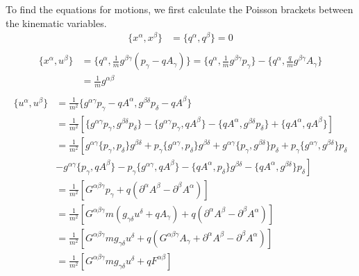 To find the equations for motions, we first calculate the Poisson brackets between the kinematic variables.
\begin{equation}
	\begin{aligned}
		\{x^\alpha, x^\beta\} &= \{q^\alpha, q^\beta\} = 0 \\
	\end{aligned}
\end{equation}
\begin{equation}
\begin{aligned}
		\{x^\alpha, u^\beta\} &= \{q^\alpha, \frac{1}{m} g^{\beta\gamma}(p_\gamma - q A_\gamma)\} = \{q^\alpha, \frac{1}{m} g^{\beta\gamma} p_\gamma\} - \{q^\alpha, \frac{q}{m} g^{\beta\gamma} A_\gamma\} \\
		&= \frac{1}{m} g^{\alpha\beta} \\
\end{aligned}
\end{equation}
\begin{equation}
\begin{aligned}
		\{u^\alpha, u^\beta\} &= \frac{1}{m^2} \{g^{\alpha \gamma} 	p_\gamma - q A^\alpha, g^{\beta \delta} p_\delta - q A^\beta\} \\
		&= \frac{1}{m^2}\left[ \{g^{\alpha \gamma} p_\gamma, g^{\beta \delta} p_\delta\} - \{g^{\alpha \gamma} p_\gamma, q A^\beta\} - \{q A^\alpha , g^{\beta \delta} p_\delta \} + \{q A^\alpha , q A^\beta\} \right]\\
		&= \frac{1}{m^2}\left[ g^{\alpha \gamma} \{p_\gamma, p_\delta\} g^{\beta \delta} + p_\gamma \{g^{\alpha \gamma}, p_\delta\} g^{\beta \delta} + g^{\alpha \gamma} \{p_\gamma, g^{\beta \delta}\} p_\delta + p_\gamma \{g^{\alpha \gamma}, g^{\beta \delta}\} p_\delta \right.\\
		&\left. - g^{\alpha \gamma} \{p_\gamma, q A^\beta\} - p_\gamma \{g^{\alpha \gamma} , q A^\beta\} - \{q A^\alpha , p_\delta \} g^{\beta \delta} - \{q A^\alpha , g^{\beta \delta} \} p_\delta \right]\\
		&= \frac{1}{m^2}\left[ G^{\alpha\beta\gamma} p_\gamma  + q (\partial^\alpha A^\beta - \partial^\beta A^\alpha) \right] \\
		&= \frac{1}{m^2}\left[ G^{\alpha \beta \gamma} m ( g_{\gamma \delta} u^\delta + q A_\gamma ) + q (\partial^\alpha A^\beta - \partial^\beta A^\alpha) \right] \\
		&= \frac{1}{m^2}\left[ G^{\alpha \beta \gamma} m g_{\gamma \delta} u^\delta + q (G^{\alpha \beta \gamma} A_\gamma + \partial^\alpha A^\beta - \partial^\beta A^\alpha) \right] \\
		&= \frac{1}{m^2}\left[ G^{\alpha \beta \gamma} m g_{\gamma \delta} u^\delta +  q F^{\alpha \beta} \right] \\
	\end{aligned}
\end{equation}

